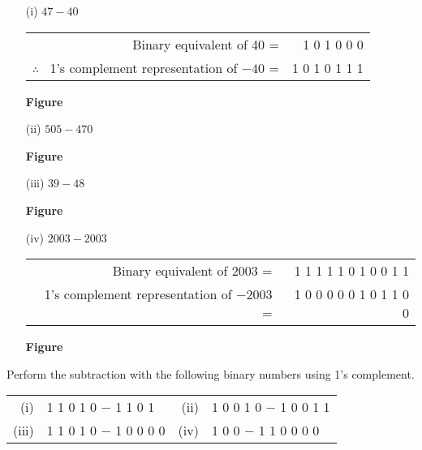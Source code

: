 \begin{solution}
\begin{itemize}
\item[(i)] $47-40$
\begin{center}
\begin{tabular}{r@{\qquad}r}
Binary equivalent of 40 = & 1 0 1 0 0 0\\[3pt]
$\therefore$~ 1's complement representation of $-40$ = & 1 0 1 0 1 1 1
\end{tabular}
\end{center}
\begin{center}
{\bf Figure}
\end{center}

\item[(ii)] $505-470$
\begin{center}
{\bf Figure}
\end{center}

\item[(iii)] $39-48$
\begin{center}
{\bf Figure}
\end{center}

\item[(iv)] $2003-2003$
\begin{center}
\begin{tabular}{r@{\qquad}r}
Binary equivalent of 2003 = & 1 1 1 1 1 0 1 0 0 1 1\\[3pt]
1's complement representation of $-2003$ = & 1 0 0 0 0 0 1 0 1 1 0 0
\end{tabular}
\end{center}
\begin{center}
{\bf Figure}
\end{center}
\end{itemize}
\end{solution}

\begin{problem}\label{prob5.29}
Perform the subtraction with the following binary numbers using 1's complement.
\begin{center}
\begin{tabular}{r@{\;\,}l@{\qquad\quad}r@{\;\,}l}
(i) & 1 1 0 1 0 $-$ 1 1 0 1 & (ii) & 1 0 0 1 0 $-$ 1 0 0 1 1\\[3pt] 
(iii) & 1 1 0 1 0 $-$ 1 0 0 0 0 & (iv) & 1 0 0 $-$ 1 1 0 0 0 0 
\end{tabular}
\end{center}
\end{problem}

